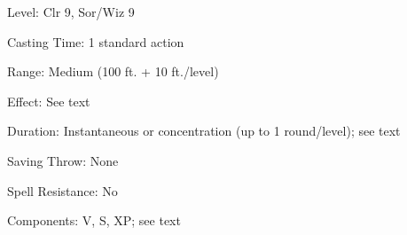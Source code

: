 
\begin{description*}
\item[Level:] Clr 9, Sor/Wiz 9
\item[Casting Time:] 1 standard action
\item[Range:] Medium (100 ft. + 10 ft./level)
\item[Effect:] See text
\item[Duration:] Instantaneous or concentration (up to 1 round/level); see text
\item[Saving Throw:] None
\item[Spell Resistance:] No
\item[Components:] V, S, XP; see text
\end{description*}


